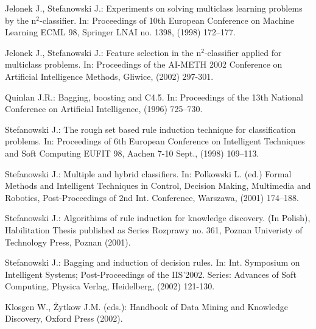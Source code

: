 \documentclass{llncs}
\begin{document}
\begin{thebibliography}{17}

  Jelonek J., Stefanowski J.: Experiments on solving
multiclass learning problems by the n$^2$-classifier. In: Proceedings of
10th European Conference on Machine Learning ECML 98, Springer LNAI no.
1398, (1998) 172--177.

 Jelonek J., Stefanowski J.: Feature selection
in the  n$^2$-classifier applied for multiclass problems. In: Proceedings of
the AI-METH 2002 Conference on Artificial Intelligence Methods, Gliwice,
(2002) 297-301.


  Quinlan J.R.: Bagging, boosting and C4.5. In: Proceedings
of the 13th National Conference on Artificial Intelligence, (1996) 725--730.



  Stefanowski J.: The rough set based rule induction
technique for classification problems. In: Proceedings of 6th European
Conference on Intelligent Techniques and Soft Computing EUFIT 98, Aachen
7-10 Sept., (1998) 109--113.

 Stefanowski J.: Multiple and hybrid classifiers.
In: Polkowski L. (ed.) Formal Methods and Intelligent Techniques in Control,
Decision Making, Multimedia and Robotics, Post-Proceedings of 2nd Int.
Conference, Warszawa, (2001) 174--188.

Stefanowski J.: Algorithims of rule induction for knowledge discovery. (In
Polish), Habilitation Thesis published as Series Rozprawy no. 361, Poznan
Univeristy of Technology Press, Poznan (2001).


 Stefanowski J.:  Bagging and induction of decision rules. In:
 Int. Symposium on Intelligent Systems; Post-Proceedings of the
IIS'2002. Series: Advances of Soft Computing, Physica Verlag, Heidelberg,
(2002) 121-130.

 Klosgen W., \.Zytkow J.M. (eds.): Handbook of Data Mining and Knowledge
Discovery, Oxford Press (2002).

\end{thebibliography}
\end{document}
